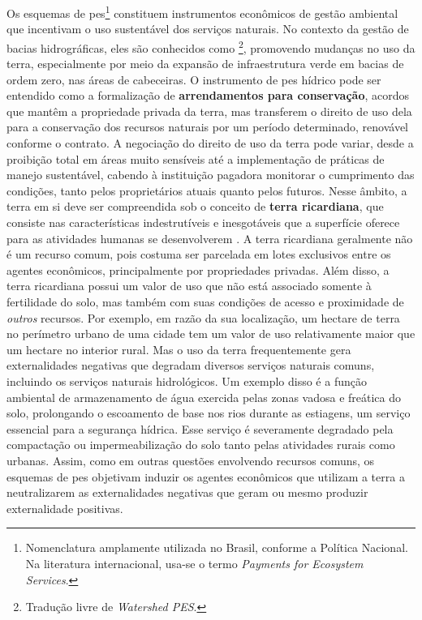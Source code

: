 \documentclass[./main.tex]{subfiles}
\begin{document}
\par Os esquemas de \acrfull{pes}\footnote{Nomenclatura amplamente utilizada no Brasil, conforme a Política Nacional. Na literatura internacional, usa-se o termo \textit{Payments for Ecosystem Services}.} constituem instrumentos econômicos de gestão ambiental que incentivam o uso sustentável dos serviços naturais. No contexto da gestão de bacias hidrográficas, eles são conhecidos como \footnote{Tradução livre de \textit{Watershed PES}.}, promovendo mudanças no uso da terra, especialmente por meio da expansão de infraestrutura verde em bacias de ordem zero, nas áreas de cabeceiras. O instrumento de \acrfull{pes} hídrico pode ser entendido como a formalização de \textbf{arrendamentos para conservação}, acordos que mantêm a propriedade privada da terra, mas transferem o direito de uso dela para a conservação dos recursos naturais por um período determinado, renovável conforme o contrato. A negociação do direito de uso da terra pode variar, desde a proibição total em áreas muito sensíveis até a implementação de práticas de manejo sustentável, cabendo à instituição pagadora monitorar o cumprimento das condições, tanto pelos proprietários atuais quanto pelos futuros. Nesse âmbito, a terra em si deve ser compreendida sob o conceito de \textbf{terra ricardiana}, que consiste nas características indestrutíveis e inesgotáveis que a superfície oferece para as atividades humanas se desenvolverem \cite{haddad2023}. A terra ricardiana geralmente não é um recurso comum, pois costuma ser parcelada em lotes exclusivos entre os agentes econômicos, principalmente por propriedades privadas. Além disso, a terra ricardiana possui um valor de uso que não está associado somente à fertilidade do solo, mas também com suas condições de acesso e proximidade de \textit{outros} recursos. Por exemplo, em razão da sua localização, um hectare de terra no perímetro urbano de uma cidade tem um valor de uso relativamente maior que um hectare no interior rural. Mas o uso da terra frequentemente gera externalidades negativas que degradam diversos serviços naturais comuns, incluindo os serviços naturais hidrológicos. Um exemplo disso é a função ambiental de armazenamento de água exercida pelas zonas vadosa e freática do solo, prolongando o escoamento de base nos rios durante as estiagens, um serviço essencial para a segurança hídrica. Esse serviço é severamente degradado pela compactação ou impermeabilização do solo tanto pelas atividades rurais como urbanas. Assim, como em outras questões envolvendo recursos comuns, os esquemas de \acrshort{pes} objetivam induzir os agentes econômicos que utilizam a terra a neutralizarem as externalidades negativas que geram ou mesmo produzir externalidade positivas.
\end{document}
